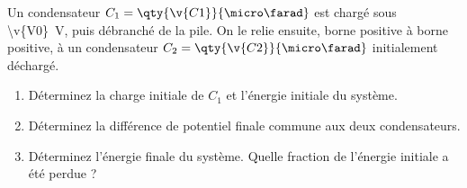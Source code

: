 Un condensateur $C_1 = \qty{\v{C1}}{\micro\farad}$ est chargé sous \qty{\v{V0}}{V}, puis débranché de la pile. On le relie ensuite, borne positive à borne positive, à un condensateur $C_2 = \qty{\v{C2}}{\micro\farad}$ initialement déchargé.

\begin{enumerate}[label=\alph*)]
    \item Déterminez la charge initiale de $C_1$ et l'énergie initiale du système.
    \item Déterminez la différence de potentiel finale commune aux deux condensateurs.
    \item Déterminez l'énergie finale du système. Quelle fraction de l'énergie initiale a été perdue ?
\end{enumerate}
